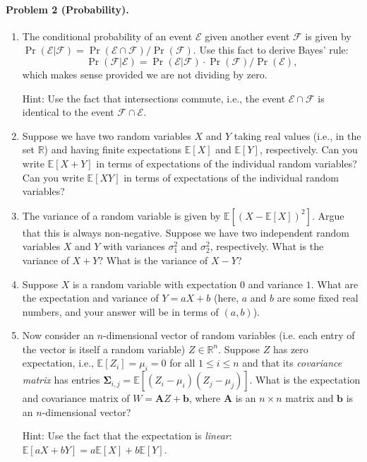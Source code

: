 \documentclass[11pt,twoside]{article}
\begin{document}
\paragraph{Problem 2 (Probability).}
\begin{enumerate}[label=(\alph*)]
\item The conditional probability of an event $\mathcal{E}$ given another event $\mathcal{F}$ is given by $\Pr(\mathcal{E}|\mathcal{F}) = \Pr(\mathcal{E} \cap \mathcal{F}) / \Pr(\mathcal{F})$. Use this fact to derive Bayes' rule:
\[
\Pr (\mathcal{F} | \mathcal{E} ) = \Pr (\mathcal{E}|\mathcal{F}) \cdot \Pr (\mathcal{F}) / \Pr(\mathcal{E}),
\]
which makes sense provided we are not dividing by zero.

Hint: Use the fact that intersections commute, i.e., the event $\mathcal{E} \cap \mathcal{F}$ is identical to the event $\mathcal{F} \cap \mathcal{E}$.
        \item Suppose we have two random variables $X$ and $Y$ taking real values (i.e., in the set $\mathbb{R}$) and having finite expectations $\mathbb{E}[X]$ and $\mathbb{E}[Y]$, respectively. Can you write $\mathbb{E}[X + Y]$ in terms of expectations of the individual random variables? Can you write $\mathbb{E}[X Y]$ in terms of expectations of the individual random variables?
        \item The variance of a random variable is given by $\mathbb{E}[(X - \mathbb{E}[X])^2]$. Argue that this is always non-negative. Suppose we have two independent random variables $X$ and $Y$ with variances $\sigma_1^2$ and $\sigma_2^2$, respectively. What is the variance of $X + Y$? What is the variance of $X - Y$?
        \item Suppose $X$ is a random variable with expectation $0$ and variance $1$. What are the expectation and variance of $Y = aX + b$ (here, $a$ and $b$ are some fixed real numbers, and your answer will be in terms of $(a, b)$).
        \item Now consider an $n$-dimensional vector of random variables (i.e. each entry of the vector is itself a random variable) $Z \in \mathbb{R}^n$.
        Suppose $Z$ has zero expectation, i.e., $\mathbb{E}[Z_i] = \mu_i = 0$ for all $1 \leq i \leq n$ and that its \emph{covariance matrix} has entries $\mathbf \Sigma_{i,j} = \mathbb{E}[(Z_i - \mu_i)(Z_j - \mu_j)]$. What is the expectation and covariance matrix of $W = \mathbf A Z +  \mathbf b$, where $\mathbf A$ is an $n \times n$ matrix and $\mathbf b$ is an $n$-dimensional vector?

        Hint: Use the fact that the expectation is \emph{linear}: $\mathbb{E}[a X + bY] = a \mathbb{E}[X] + b \mathbb{E}[Y]$.
\end{enumerate}
\end{document}
